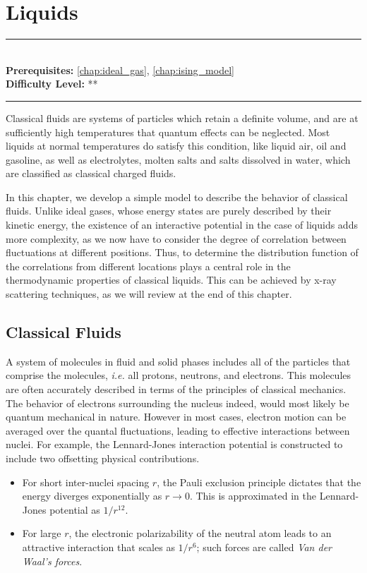 \documentclass[book.tex]{subfiles}
\begin{document}
\chapter{Liquids}
\label{chap:liquids}
\noindent\rule{11cm}{0.4pt} \\
\textbf{Prerequisites:} \autoref{chap:ideal_gas}, \autoref{chap:ising_model}  \\
\textbf{Difficulty Level:} ** \\
\noindent\rule{11cm}{0.4pt}
\vspace{5mm}

Classical fluids are systems of particles which retain a definite volume, and are at sufficiently high temperatures that quantum effects can be neglected. Most liquids at normal temperatures do satisfy this condition,  like liquid air, oil and gasoline, as well as electrolytes, molten salts and salts dissolved in water, which are classified as classical charged fluids.

In this chapter, we develop a simple model to describe the behavior of classical fluids. Unlike ideal gases, whose energy states are purely described by their kinetic energy, the existence of an interactive potential in the case of liquids adds more complexity, as we now have to consider the degree of correlation between fluctuations at different positions. Thus, to determine the distribution function of the correlations from different locations plays a central role in the thermodynamic properties of classical liquids. This can be achieved by x-ray scattering techniques, as we will review at the end of this chapter.

\section{Classical Fluids}

A system of molecules in fluid and solid phases includes all of the particles that comprise the molecules, \textit{i.e.} all protons, neutrons, and electrons. This molecules are often accurately described in terms of the principles of classical mechanics. The behavior of electrons surrounding the nucleus indeed, would most likely be quantum mechanical in nature. However in most cases, electron motion can be averaged over the quantal fluctuations, leading to effective interactions between nuclei. For example, the Lennard-Jones interaction potential is constructed to include two offsetting physical contributions.

\begin{itemize}
\item For short inter-nuclei spacing $r$, the Pauli exclusion principle dictates that the energy diverges exponentially as $r\rightarrow0$. This is approximated in the Lennard-Jones potential as $1/r^{12}$.
\item For large $r$, the electronic polarizability of the neutral atom leads to an attractive interaction that scales as $1/r^6$; such forces are called \textit{Van der Waal's forces}.
\end{itemize}
\end{document}

